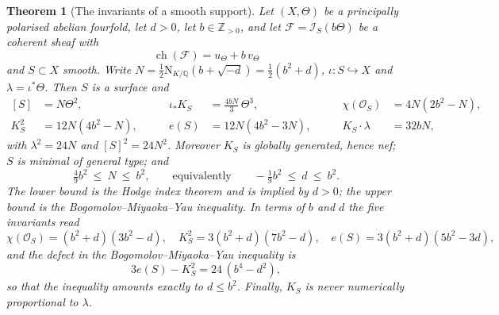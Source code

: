 \documentclass[11pt,reqno]{amsart}
\theoremstyle{plain}
\newtheorem{theorem}{Theorem}[section]
\theoremstyle{definition}
\theoremstyle{remark}
\newcommand{\QQ}{\mathbb{Q}}
\newcommand{\ZZ}{\mathbb{Z}}
\newcommand{\cF}{\mathcal{F}}
\newcommand{\cO}{\mathcal{O}}
\newcommand{\cI}{\mathcal{I}}
\newcommand{\Nm}{\mathrm{N}}             %
\DeclareMathOperator{\ch}{ch}
\begin{document}
\begin{theorem}[The invariants of a smooth support]\label{thm:smoothinvariants}
Let $(X,\Theta)$ be a principally polarised abelian fourfold, let $d>0$, let
$b\in\ZZ_{>0}$, and let $\cF=\cI_{S}(b\Theta)$ be a coherent sheaf with
\[
  \ch(\cF)=u_{\Theta}+b\,v_{\Theta}
\]
and $S\subset X$ smooth. Write $N=\tfrac12\Nm_{K/\QQ}(b+\sqrt{-d})
=\tfrac12(b^{2}+d)$, $\iota\colon S\hookrightarrow X$ and
$\lambda=\iota^{*}\Theta$. Then $S$ is a surface and
\begin{equation}\label{eq:smoothinvariants}
\begin{aligned}
  [S]&=N\Theta^{2}, &\qquad \iota_{*}K_{S}&=\tfrac{4bN}{3}\,\Theta^{3},
  &\qquad \chi(\cO_{S})&=4N(2b^{2}-N),\\
  K_{S}^{2}&=12N(4b^{2}-N), &\qquad e(S)&=12N(4b^{2}-3N),
  &\qquad K_{S}\cdot\lambda&=32bN,
\end{aligned}
\end{equation}
with $\lambda^{2}=24N$ and $[S]^{2}=24N^{2}$. Moreover $K_{S}$ is globally
generated, hence nef; $S$ is minimal of general type; and
\begin{equation}\label{eq:threebounds}
  \tfrac{4}{9}b^{2}\ \le\ N\ \le\ b^{2},
  \qquad\text{equivalently}\qquad
  -\tfrac{1}{9}b^{2}\ \le\ d\ \le\ b^{2} .
\end{equation}
The lower bound is the Hodge index theorem and is implied by $d>0$; the upper
bound is the Bogomolov--Miyaoka--Yau inequality. In terms of $b$ and $d$ the
five invariants read
\begin{equation}\label{eq:bdform}
  \chi(\cO_{S})=(b^{2}+d)(3b^{2}-d),\quad
  K_{S}^{2}=3(b^{2}+d)(7b^{2}-d),\quad
  e(S)=3(b^{2}+d)(5b^{2}-3d),
\end{equation}
and the defect in the Bogomolov--Miyaoka--Yau inequality is
\begin{equation}\label{eq:bmydefect}
  3e(S)-K_{S}^{2}=24\,(b^{4}-d^{2}),
\end{equation}
so that the inequality amounts exactly to $d\le b^{2}$.
Finally, $K_{S}$ is never numerically proportional to $\lambda$.
\end{theorem}
\end{document}
